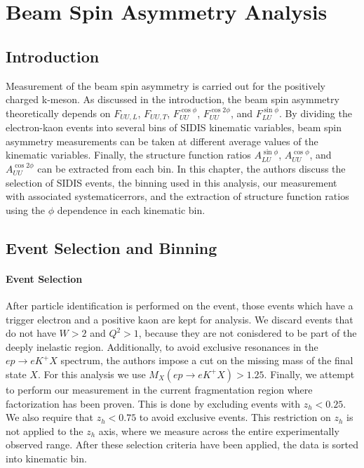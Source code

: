 \chapter{Beam Spin Asymmetry Analysis}

\section{Introduction}
Measurement of the beam spin asymmetry is carried out for the positively charged k-meson.  As discussed in the introduction, the beam spin asymmetry theoretically depends on $F_{UU,L}$, $F_{UU,T}$, $F_{UU}^{\cos\phi}$, $F_{UU}^{\cos 2\phi}$, and $F_{LU}^{\sin\phi}$.  By dividing the electron-kaon events into several bins of SIDIS kinematic variables, beam spin asymmetry measurements can be taken at different average values of the kinematic variables.  Finally, the structure function ratios $A_{LU}^{\sin\phi}$, $A_{UU}^{\cos\phi}$, and $A_{UU}^{\cos 2\phi}$ can be extracted from each bin.  In this chapter, the authors discuss the selection of SIDIS events, the binning used in this analysis, our measurement with associated systematicerrors, and the extraction of structure function ratios using the $\phi$ dependence in each kinematic bin.

\section{Event Selection and Binning}
\subsubsection*{Event Selection}
After particle identification is performed on the event, those events which have a trigger electron and a positive kaon are kept for analysis.  We discard events that do not have $W > 2$ and $Q^2 > 1$, because they are not conisdered to be part of the deeply inelastic region.  Additionally, to avoid exclusive resonances in the $ep \rightarrow eK^+X$ spectrum, the authors impose a cut on the missing mass of the final state $X$.  For this analysis we use $M_{X} (ep \rightarrow eK^+X) > 1.25$.  Finally, we attempt to perform our measurement in the current fragmentation region where factorization has been proven.  This is done by excluding events with $z_h < 0.25$.  We also require that $z_h < 0.75$ to avoid exclusive events.  This restriction on $z_h$ is not applied to the $z_h$ axis, where we measure across the entire experimentally observed range.  After these selection criteria have been applied, the data is sorted into kinematic bin.

